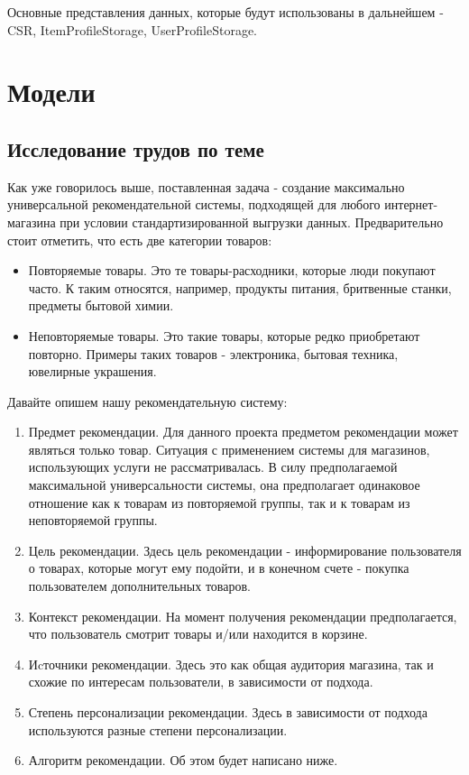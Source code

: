 \documentclass[14pt]{mmcs_article}
\begin{document}
Основные представления данных, которые будут использованы в дальнейшем - CSR, ItemProfileStorage, UserProfileStorage.


\section{Модели}\label{dsfs}
\subsection{Исследование трудов по теме}
Как уже говорилось выше, поставленная задача - создание максимально универсальной рекомендательной системы, подходящей для любого интернет-магазина при условии стандартизированной выгрузки данных.
Предварительно стоит отметить, что есть две категории товаров:
\begin{itemize}
	\item Повторяемые товары. Это те товары-расходники, которые люди покупают часто. К таким относятся, например, продукты питания, бритвенные станки, предметы бытовой химии.
	\item  Неповторяемые товары. Это такие товары, которые редко приобретают повторно. Примеры таких товаров - электроника, бытовая техника, ювелирные украшения.
\end{itemize}
Давайте опишем нашу рекомендательную систему:
\begin{enumerate}
\item Предмет рекомендации. Для данного проекта предметом рекомендации может являться только товар. Ситуация с применением системы для магазинов, использующих услуги не рассматривалась. В силу предполагаемой максимальной универсальности системы, она предполагает одинаковое отношение как к товарам из повторяемой группы, так и к товарам из неповторяемой группы.
\item Цель рекомендации. Здесь цель рекомендации - информирование пользователя о товарах, которые могут ему подойти, и в конечном счете - покупка пользователем дополнительных товаров.
\item Контекст рекомендации. На момент получения рекомендации предполагается, что пользователь смотрит товары и/или находится в корзине.
\item Иcточники рекомендации. Здесь это как общая аудитория магазина, так и схожие по интересам пользователи, в зависимости от подхода.
\item Степень персонализации рекомендации. Здесь в зависимости от подхода используются разные степени персонализации.
\item Алгоритм рекомендации. Об этом будет написано ниже. 
\end{enumerate}
\end{document}
